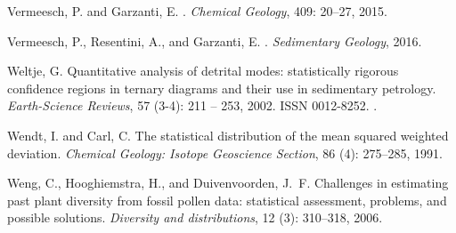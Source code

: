 \documentclass{article}
\begin{document}
\begin{thebibliography}{32}
Vermeesch, P. and Garzanti, E.
.
\newblock \emph{Chemical Geology}, 409: 20--27, 2015.

Vermeesch, P., Resentini, A., and Garzanti, E.
.
\newblock \emph{Sedimentary Geology}, 2016.

Weltje, G.
\newblock Quantitative analysis of detrital modes: statistically rigorous
  confidence regions in ternary diagrams and their use in sedimentary
  petrology.
\newblock \emph{Earth-Science Reviews}, 57 (3-4): 211 -- 253,
  2002.
\newblock ISSN 0012-8252.
\newblock {}.

Wendt, I. and Carl, C.
\newblock The statistical distribution of the mean squared weighted deviation.
\newblock \emph{Chemical Geology: Isotope Geoscience Section}, 86
  (4): 275--285, 1991.

Weng, C., Hooghiemstra, H., and Duivenvoorden, J.~F.
\newblock Challenges in estimating past plant diversity from fossil pollen
  data: statistical assessment, problems, and possible solutions.
\newblock \emph{Diversity and distributions}, 12 (3):
  310--318, 2006.

\end{thebibliography}
\end{document}
